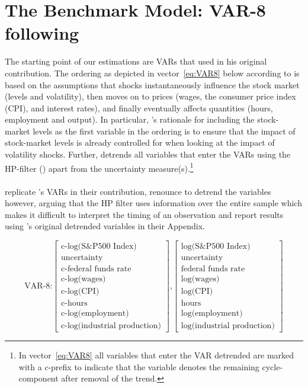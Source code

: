 \documentclass[a4paper,12pt,oneside,pointednumbers,bibtotoc,bigheadings,liststotoc]{scrbook}
\begin{document}
\section{The Benchmark Model: VAR-8 following \citet{bloom:09}}
\label{sec:VAR8}
The starting point of our estimations are VARs that \citet{bloom:09} used in his original contribution. The ordering as depicted in vector~\ref{eq:VAR8} below according to \citet[p. 630]{bloom:09} is based on the assumptions that shocks instantaneously influence the stock market (levels and volatility), then moves on to prices (wages, the consumer price index (CPI), and interest rates), and finally eventually affects quantities (hours, employment and output). In particular, \citet{bloom:09}'s rationale for including the stock-market levels as the first variable in the ordering is to ensure that the impact of stock-market levels is already controlled for when looking at the impact of volatility shocks. Further, \citet{bloom:09} detrends all variables that enter the VARs using the HP-filter (\citealp{hodrickandprescott:97}) apart from the uncertainty measure(s).\footnote{In vector~\ref{eq:VAR8} all variables that enter the VAR detrended are marked with a $c$-prefix to indicate that the variable denotes the remaining cycle-component after removal of the trend.}\\
\\
\citet{juradoetal:15} replicate \citet{bloom:09}'s VARs in their contribution, renounce to detrend the variables however, arguing that the HP filter uses information over the entire sample which makes it difficult to interpret the timing of an observation and report results using \citet{bloom:09}'s original detrended variables in their Appendix. 

\begin{equation} \label{eq:VAR8}
\text{VAR-8:} \begin{bmatrix} \text{c-log(S\&P500 Index)} \\ 
				      \text{uncertainty}\\ 
				      \text{c-federal funds rate}\\
				      \text{c-log(wages)}\\
				      \text{c-log(CPI)}\\
				      \text{c-hours}\\
				      \text{c-log(employment)}\\
				      \text{c-log(industrial production)}
	      \end{bmatrix}\text{,}
	      \begin{bmatrix} \text{log(S\&P500 Index)} \\ 
				      \text{uncertainty}\\ 
				      \text{federal funds rate}\\
				      \text{log(wages)}\\
				      \text{log(CPI)}\\
				      \text{hours}\\
				      \text{log(employment)}\\
				      \text{log(industrial production)}
	      \end{bmatrix}
\end{equation}
\end{document}
